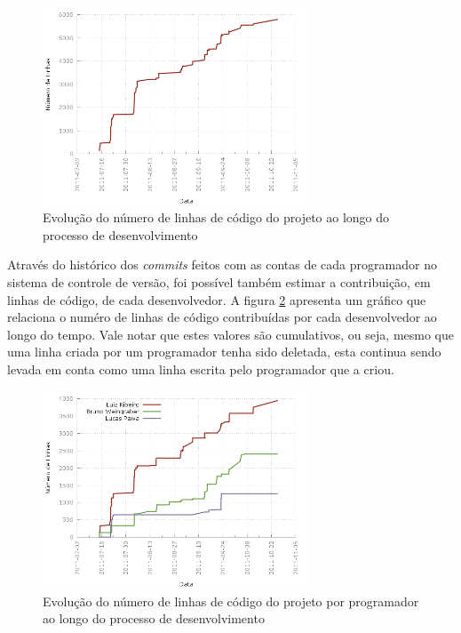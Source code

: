 \begin{figure}[!htb]
	\centering
	\includegraphics[width=0.7\textwidth]{./plots/lines_of_code.png}
	\caption[Evolução do número de linhas de código do projeto]{Evolução do número de linhas de código do projeto ao longo do processo de desenvolvimento}
	\label{fig:linesofcode}
\end{figure}

Através do histórico dos \emph{commits} feitos com as contas de cada programador no sistema de controle de versão, foi possível também estimar a contribuição, em linhas de código, de cada desenvolvedor.
A figura \ref{fig:linesofcodebyauthor} apresenta um gráfico que relaciona o numéro de linhas de código contribuídas por cada desenvolvedor ao longo do tempo.
Vale notar que estes valores são cumulativos, ou seja, mesmo que uma linha criada por um programador tenha sido deletada, esta continua sendo levada em conta como uma linha escrita pelo programador que a criou.


\begin{figure}[!htb]
	\centering
	\includegraphics[width=0.7\textwidth]{./plots/lines_of_code_by_author.png}
	\caption[Evolução do número de linhas de código por programador]{Evolução do número de linhas de código do projeto por programador ao longo do processo de desenvolvimento}
	\label{fig:linesofcodebyauthor}
\end{figure}

